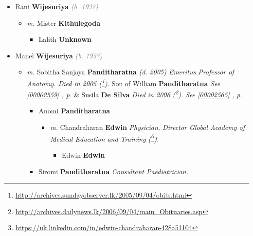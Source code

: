 \documentclass[10pt, openany]{book}
\begin{document}
\begin{itemize}
{\begin{itemize}
{\begin{itemize}
{\begin{itemize}
{\begin{itemize}
\item{Rani \textbf{Wijesuriya} \textcolor{gray}{\textit{(b. 193?)}}
\begin{itemize}
\item{\textit{m.} Mister \textbf{Kithulegoda} \textcolor{slorange}{\textit{}}   \label{couple:00000476:00001015} \begin{itemize}
\item{Lalith \textbf{Unknown} \textcolor{slorange}{\textit{}}
 }
\end{itemize}}
\end{itemize}
 }
\item{Manel \textbf{Wijesuriya} \textcolor{gray}{\textit{(b. 193?)}}
\begin{itemize}
\item{\textit{m.} Sobitha Sanjaya \textbf{Panditharatna} \textcolor{slorange}{\textit{(d. 2005)}} \textcolor{slmaroon}{\textit{Emeritus Professor of Anatomy.
Died in 2005 (\footnote{\url{http://archives.sundayobserver.lk/2005/09/04/obits.html}}).}} Son of  William \textbf{Panditharatna} \textcolor{slorange}{\textit{}} \textcolor{slteal}{\textit{See  \autoref{00002559} \textit{, p. \pageref{00002559} }}}  \&  Susila \textbf{De Silva} \textcolor{slorange}{\textit{}} \textcolor{slmaroon}{\textit{Died in 2006 (\footnote{\url{http://archives.dailynews.lk/2006/09/04/main_Obituaries.asp}}).}} \textcolor{slteal}{\textit{See  \autoref{00002565} \textit{, p. \pageref{00002565} }}}   \label{couple:00000581:00001014} \begin{itemize}
\item{Anomi \textbf{Panditharatna} \textcolor{slorange}{\textit{}}
\begin{itemize}
\item{\textit{m.} Chandraharan \textbf{Edwin} \textcolor{slorange}{\textit{}} \textcolor{slmaroon}{\textit{Physician. Director Global Academy of Medical Education and Training (\footnote{\url{https://uk.linkedin.com/in/edwin-chandraharan-428a51104}}).}}   \label{couple:00000186:00000579} \begin{itemize}
\item{Edwin \textbf{Edwin} \textcolor{slorange}{\textit{}}
 }
\end{itemize}}
\end{itemize}
 }
\item{Siromi \textbf{Panditharatna} \textcolor{slorange}{\textit{}} \textcolor{slmaroon}{\textit{Consultant Paediatrician.}}
}
\end{itemize}}
\end{itemize}}
\end{itemize}}
\end{itemize}}
\end{itemize}}
\end{itemize}}
\end{itemize}
\end{document}
